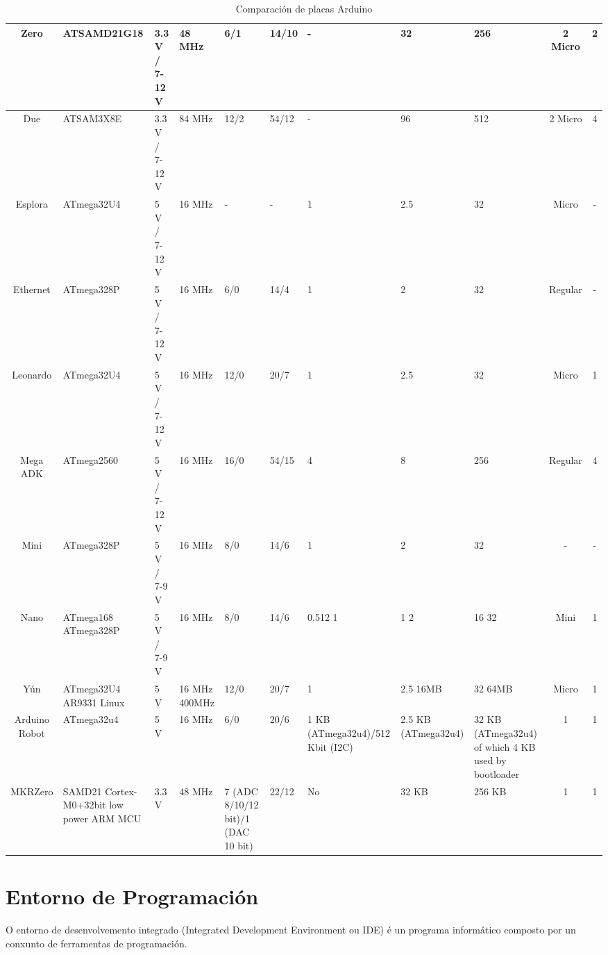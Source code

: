\documentclass[11pt,twoside]{book}
\begin{document}
\begin{table}[htb]
\begin{center}
{\begin{tabular}{|c|m{3cm}|m{3.5cm}|m{2cm}|m{2cm}|m{2cm}|m{2cm}|m{2cm}|m{2cm}|c|c|}
\hline
Zero & ATSAMD21G18 & 3.3 V / 7-12 V & 48 MHz & 6/1 & 14/10 & - & 32 & 256 & 2 Micro & 2 \\
\hline
Due & ATSAM3X8E & 3.3 V / 7-12 V & 84 MHz & 12/2 & 54/12 & - & 96 & 512 & 2 Micro & 4\\
\hline
Esplora & ATmega32U4 & 5 V / 7-12 V & 16 MHz & - & - & 1 & 2.5 & 32 & Micro & - \\
\hline
Ethernet & ATmega328P & 5 V / 7-12 V & 16 MHz & 6/0 & 14/4 & 1 & 2 & 32 & Regular & - \\
\hline
Leonardo & ATmega32U4 & 5 V / 7-12 V & 16 MHz & 12/0 & 20/7 & 1 & 2.5 & 32 & Micro & 1 \\
\hline
Mega ADK & ATmega2560 & 5 V / 7-12 V & 16 MHz & 16/0 & 54/15 & 4 & 8 & 256 & Regular & 4 \\
\hline
Mini & ATmega328P & 5 V / 7-9 V & 16 MHz & 8/0 & 14/6 & 1 & 2 & 32 & - & - \\
\hline
Nano & ATmega168 \newline ATmega328P & 5 V / 7-9 V & 16 MHz & 8/0 & 14/6 & 0.512  1 & 1  2 & 16 32 & Mini & 1 \\
\hline
Yún & ATmega32U4 \newline AR9331 Linux & 5 V & 16 MHz \newline 400MHz & 12/0 & 20/7 & 1 & 2.5 \newline  16MB & 32 \newline   64MB & Micro & 1 \\
\hline
Arduino Robot & ATmega32u4 & 5 V & 16 MHz & 6/0 & 20/6 & 1 KB (ATmega32u4)/512 Kbit (I2C) & 2.5 KB (ATmega32u4) & 32 KB (ATmega32u4) of which 4 KB used by bootloader & 1 & 1 \\
\hline
MKRZero & SAMD21 \newline  Cortex-M0+32bit low power \newline ARM MCU & 3.3 V & 48 MHz & 7 (ADC 8/10/12 bit)/1 (DAC 10 bit) & 22/12 & No & 32 KB & 256 KB & 1 & 1 \\
\hline
\end{tabular}
}
\caption{Comparación de placas Arduino}
\label{taboa:comparacion}
\end{center}
\end{table}

\section{Entorno de Programación}

O entorno de desenvolvemento integrado (Integrated Development Environment ou IDE) é un programa informático composto por un conxunto de ferramentas de programación. 
\end{document}
